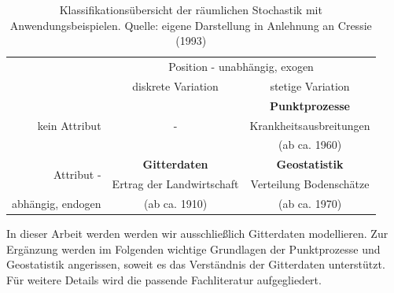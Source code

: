 \begin{table}[h!]
    \begin{center}
    \begin{tabular}{|r|c|c|}
    \hline
            & \multicolumn{2}{|c|}{\sc Position - unabhängig, exogen} \\
            \cline{2-3}
            & {\sc diskrete Variation}  & {\sc stetige Variation} \\
    \hline
    \multirow{3}{*}{\sc kein Attribut}  &    \multirow{3}{*}{-}    & \textbf{Punktprozesse} \\
            &                   & Krankheitsausbreitungen \\
            &                   & (ab ca. 1960) \\
    \hline
    \multirow{2}{*}{\sc Attribut -} & \textbf{Gitterdaten} & \textbf{Geostatistik} \\    
              & Ertrag der Landwirtschaft & Verteilung Bodenschätze \\
    {\sc abhängig, endogen}   & (ab ca. 1910) & (ab ca. 1970) \\
    \hline
    \end{tabular}
    \end{center}
    \caption{Klassifikationsübersicht der räumlichen Stochastik mit Anwendungsbeispielen. Quelle: eigene Darstellung in Anlehnung an Cressie (1993)}
    \label{table_main-classes}
\end{table}

In dieser Arbeit werden werden wir ausschließlich Gitterdaten modellieren. 
Zur Ergänzung werden im Folgenden wichtige Grundlagen der Punktprozesse und Geostatistik angerissen, 
soweit es das Verständnis der Gitterdaten unterstützt. Für weitere Details wird die passende Fachliteratur aufgegliedert.

